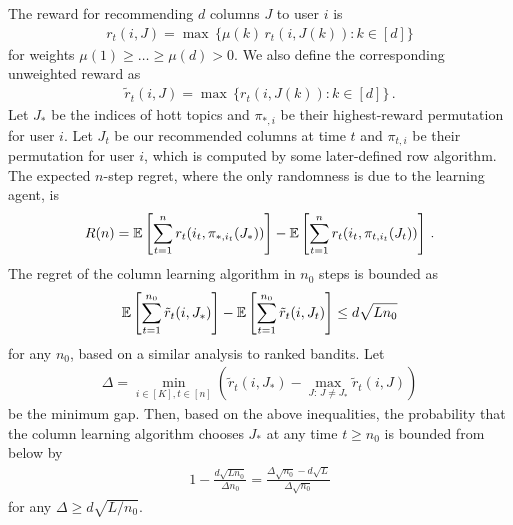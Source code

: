 The reward for recommending $d$ columns $J$ to user $i$ is
\begin{align*}
  r_t(i, J) =
  \max \, \{\mu(k) \, r_t(i, J(k)): k \in [d]\}
\end{align*}
for weights $\mu(1) \geq \dots \geq \mu(d) > 0$. We also define the corresponding unweighted reward as
\begin{align*}
  \tilde{r}_t(i, J) =
  \max \, \{r_t(i, J(k)): k \in [d]\}\,.
\end{align*}
Let $J_\ast$ be the indices of hott topics and $\pi_{\ast, i}$ be their highest-reward permutation for user $i$. Let $J_t$ be our recommended columns at time $t$ and $\pi_{t, i}$ be their permutation for user $i$, which is computed by some later-defined row algorithm. The expected $n$-step regret, where the only randomness is due to the learning agent, is
\begin{align*}
  R(n) =
  \mathbb{E}\left[\sum_{t = 1}^n r_t(i_t, \pi_{\ast, i_t}(J_\ast))\right] - \mathbb{E}\left[\sum_{t = 1}^n r_t(i_t, \pi_{t, i_t}(J_t))\right]\,.
\end{align*}
The regret of the column learning algorithm in $n_0$ steps is bounded as
\begin{align*}
  \mathbb{E}\left[\sum_{t = 1}^{n_0} \tilde{r}_t(i, J_\ast)\right] - \mathbb{E}\left[\sum_{t = 1}^{n_0} \tilde{r}_t(i, J_t)\right] \leq
  d \sqrt{L n_0}
\end{align*}
for any $n_0$, based on a similar analysis to ranked bandits. Let
\begin{align*}
  \Delta = \min_{i \in [K], t \in [n]} \left(\tilde{r}_t(i, J_\ast) - \max_{J:\, J \neq J_\ast} \tilde{r}_t(i, J)\right)
\end{align*}
be the minimum gap.  Then, based on the above inequalities, the probability that the column learning algorithm chooses $J_\ast$ at any time $t \geq n_0$ is bounded from below by
\begin{align}
  1 - \frac{d \sqrt{L n_0}}{\Delta n_0} =
  \frac{\Delta \sqrt{n_0} - d \sqrt{L}}{\Delta \sqrt{n_0}}
  \label{eq:opt lower bound}
\end{align}
for any $\Delta \geq d \sqrt{L / n_0}$.

